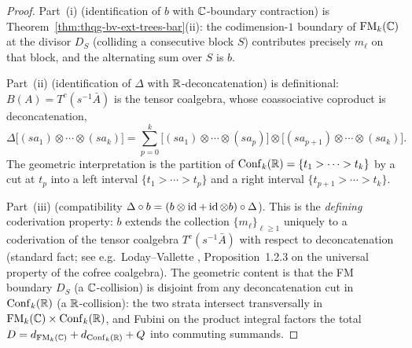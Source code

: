 \begin{proof}
Part~(i) (identification of $b$ with $\mathbb{C}$-boundary contraction)
is Theorem~\ref{thm:thqg-bv-ext-trees-bar}(ii): the codimension-$1$
boundary of $\operatorname{FM}_k(\mathbb{C})$ at the divisor $D_S$ (colliding a
consecutive block $S$) contributes precisely $m_\ell$ on that
block, and the alternating sum over $S$ is $b$.

Part~(ii) (identification of $\Delta$ with $\mathbb{R}$-deconcatenation)
is definitional: $B(A) = T^c(s^{-1}\bar A)$ is the tensor
coalgebra, whose coassociative coproduct is deconcatenation,
\[
\Delta\bigl[(sa_1) \otimes \cdots \otimes (sa_k)\bigr]
= \sum_{p=0}^{k}
\bigl[(sa_1) \otimes \cdots \otimes (sa_p)\bigr]
\otimes
\bigl[(sa_{p+1}) \otimes \cdots \otimes (sa_k)\bigr].
\]
The geometric interpretation is the partition of
$\operatorname{Conf}_k(\mathbb{R}) = \{t_1 > \cdots > t_k\}$ by a cut at $t_p$ into
a left interval $\{t_1 > \cdots > t_p\}$ and a right interval
$\{t_{p+1} > \cdots > t_k\}$.

Part~(iii) (compatibility $\Delta \circ b =
(b \otimes \operatorname{id} + \operatorname{id} \otimes b) \circ \Delta$). This is the
\emph{defining} coderivation property: $b$ extends the collection
$\{m_\ell\}_{\ell \geq 1}$ uniquely to a coderivation of the
tensor coalgebra $T^c(s^{-1}\bar A)$ with respect to
deconcatenation \textup{(}standard fact; see e.g.\
Loday--Vallette \cite{LV12}, Proposition~1.2.3 on the
universal property of the cofree coalgebra\textup{)}.
The geometric content is that the FM boundary $D_S$
(a $\mathbb{C}$-collision) is disjoint from any deconcatenation
cut in $\operatorname{Conf}_k(\mathbb{R})$ (a $\mathbb{R}$-collision): the two strata
intersect transversally in
$\operatorname{FM}_k(\mathbb{C}) \times \operatorname{Conf}_k(\mathbb{R})$, and Fubini on the product
integral factors the total $D = d_{\operatorname{FM}_k(\mathbb{C})}
+ d_{\operatorname{Conf}_k(\mathbb{R})} + Q$ into commuting summands.
\end{proof}

